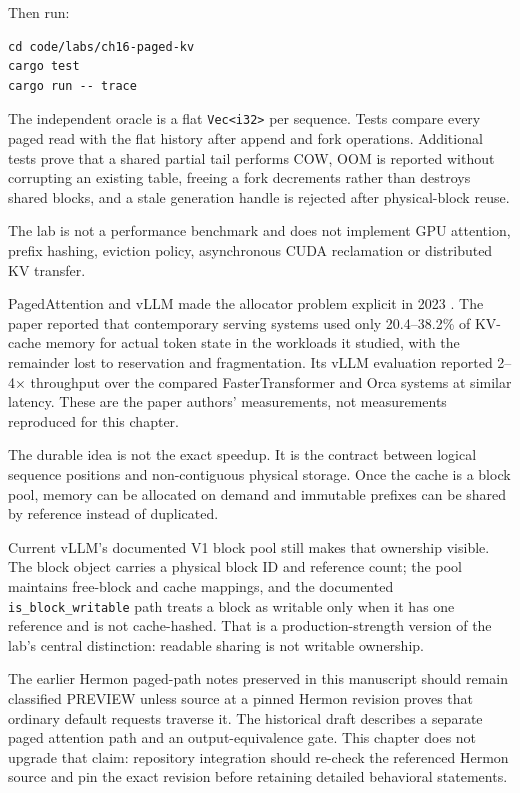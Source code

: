 Then run:
\begin{verbatim}
cd code/labs/ch16-paged-kv
cargo test
cargo run -- trace
\end{verbatim}

The independent oracle is a flat \texttt{Vec<i32>} per sequence. Tests compare
every paged read with the flat history after append and fork operations.
Additional tests prove that a shared partial tail performs COW, OOM is reported
without corrupting an existing table, freeing a fork decrements rather than
destroys shared blocks, and a stale generation handle is rejected after
physical-block reuse.

The lab is not a performance benchmark and does not implement GPU attention,
prefix hashing, eviction policy, asynchronous CUDA reclamation or distributed
KV transfer.


PagedAttention and vLLM made the allocator problem explicit in 2023
\cite{kwon2023pagedattention}. The paper reported that contemporary serving
systems used only 20.4--38.2\% of KV-cache memory for actual token state in
the workloads it studied, with the remainder lost to reservation and
fragmentation. Its vLLM evaluation reported 2--4$\times$ throughput over the
compared FasterTransformer and Orca systems at similar latency. These are the
paper authors' measurements, not measurements reproduced for this chapter.

The durable idea is not the exact speedup. It is the contract between logical
sequence positions and non-contiguous physical storage. Once the cache is a
block pool, memory can be allocated on demand and immutable prefixes can be
shared by reference instead of duplicated.

Current vLLM's documented V1 block pool still makes that ownership visible.
The block object carries a physical block ID and reference count; the pool
maintains free-block and cache mappings, and the documented
\texttt{is\_block\_writable} path treats a block as writable only when it has
one reference and is not cache-hashed. That is a production-strength version
of the lab's central distinction: readable sharing is not writable ownership.

The earlier Hermon paged-path notes preserved in this manuscript should remain
classified PREVIEW unless source at a pinned Hermon revision proves that
ordinary default requests traverse it. The historical draft describes a
separate paged attention path and an output-equivalence gate. This chapter
does not upgrade that claim: repository integration should re-check the
referenced Hermon source and pin the exact revision before retaining detailed
behavioral statements.

